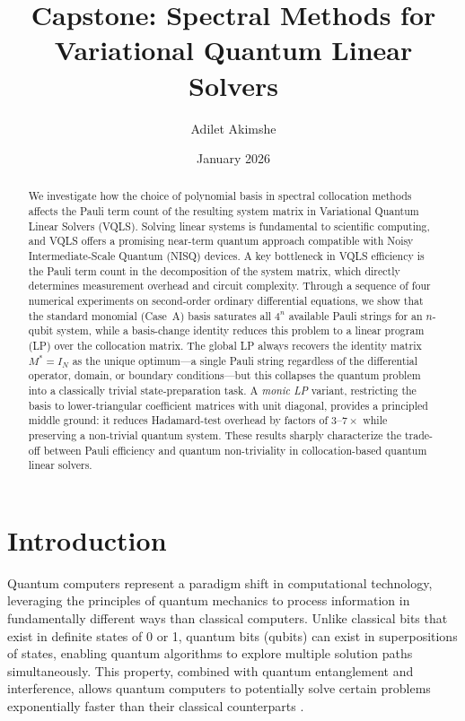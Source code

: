 \documentclass[a4paper,12pt]{amsart}
\title{Capstone: Spectral Methods for Variational Quantum Linear Solvers}
\author{Adilet Akimshe}
\date{January 2026}
\begin{document}
\begin{abstract}
We investigate how the choice of polynomial basis in spectral collocation methods affects the Pauli term count of the resulting system matrix in Variational Quantum Linear Solvers (VQLS). Solving linear systems is fundamental to scientific computing, and VQLS offers a promising near-term quantum approach compatible with Noisy Intermediate-Scale Quantum (NISQ) devices. A key bottleneck in VQLS efficiency is the Pauli term count in the decomposition of the system matrix, which directly determines measurement overhead and circuit complexity. Through a sequence of four numerical experiments on second-order ordinary differential equations, we show that the standard monomial (Case~A) basis saturates all $4^n$ available Pauli strings for an $n$-qubit system, while a basis-change identity reduces this problem to a linear program (LP) over the collocation matrix. The global LP always recovers the identity matrix $M^* = I_N$ as the unique optimum---a single Pauli string regardless of the differential operator, domain, or boundary conditions---but this collapses the quantum problem into a classically trivial state-preparation task. A \emph{monic LP} variant, restricting the basis to lower-triangular coefficient matrices with unit diagonal, provides a principled middle ground: it reduces Hadamard-test overhead by factors of $3$--$7\times$ while preserving a non-trivial quantum system. These results sharply characterize the trade-off between Pauli efficiency and quantum non-triviality in collocation-based quantum linear solvers.
\end{abstract}

\maketitle

\tableofcontents

\section{Introduction}
Quantum computers represent a paradigm shift in computational technology, leveraging the principles of quantum mechanics to process information in fundamentally different ways than classical computers. Unlike classical bits that exist in definite states of 0 or 1, quantum bits (qubits) can exist in superpositions of states, enabling quantum algorithms to explore multiple solution paths simultaneously. This property, combined with quantum entanglement and interference, allows quantum computers to potentially solve certain problems exponentially faster than their classical counterparts \cite{nielsen2011quantum, hidary2021quantum}.
\end{document}
